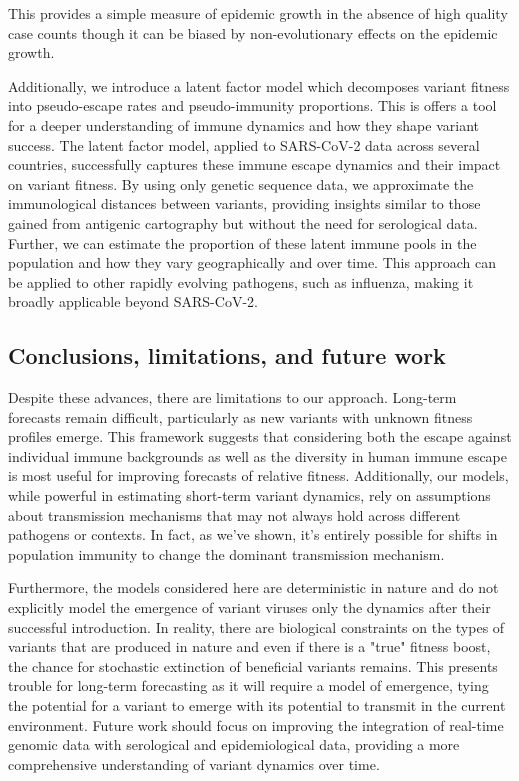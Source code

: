 \documentclass[12pt,oneside,letterpaper]{article}
\begin{document}
This provides a simple measure of epidemic growth in the absence of high quality case counts though it can be biased by non-evolutionary effects on the epidemic growth.

Additionally, we introduce a latent factor model which decomposes variant fitness into pseudo-escape rates and pseudo-immunity proportions.
This is offers a tool for a deeper understanding of immune dynamics and how they shape variant success.
The latent factor model, applied to SARS-CoV-2 data across several countries, successfully captures these immune escape dynamics and their impact on variant fitness.
 By using only genetic sequence data, we approximate the immunological distances between variants, providing insights similar to those gained from antigenic cartography but without the need for serological data.
 Further, we can estimate the proportion of these latent immune pools in the population and how they vary geographically and over time.
 This approach can be applied to other rapidly evolving pathogens, such as influenza, making it broadly applicable beyond SARS-CoV-2.

\subsection*{Conclusions, limitations, and future work}

Despite these advances, there are limitations to our approach.
Long-term forecasts remain difficult, particularly as new variants with unknown fitness profiles emerge.
This framework suggests that considering both the escape against individual immune backgrounds as well as the diversity in human immune escape is most useful for improving forecasts of relative fitness.
Additionally, our models, while powerful in estimating short-term variant dynamics, rely on assumptions about transmission mechanisms that may not always hold across different pathogens or contexts.
In fact, as we've shown, it's entirely possible for shifts in population immunity to change the dominant transmission mechanism.

Furthermore, the models considered here are deterministic in nature and do not explicitly model the emergence of variant viruses only the dynamics after their successful introduction.
In reality, there are biological constraints on the types of variants that are produced in nature and even if there is a "true" fitness boost, the chance for stochastic extinction of beneficial variants remains.
This presents trouble for long-term forecasting as it will require a model of emergence, tying the potential for a variant to emerge with its potential to transmit in the current environment.
Future work should focus on improving the integration of real-time genomic data with serological and epidemiological data, providing a more comprehensive understanding of variant dynamics over time.
\end{document}
